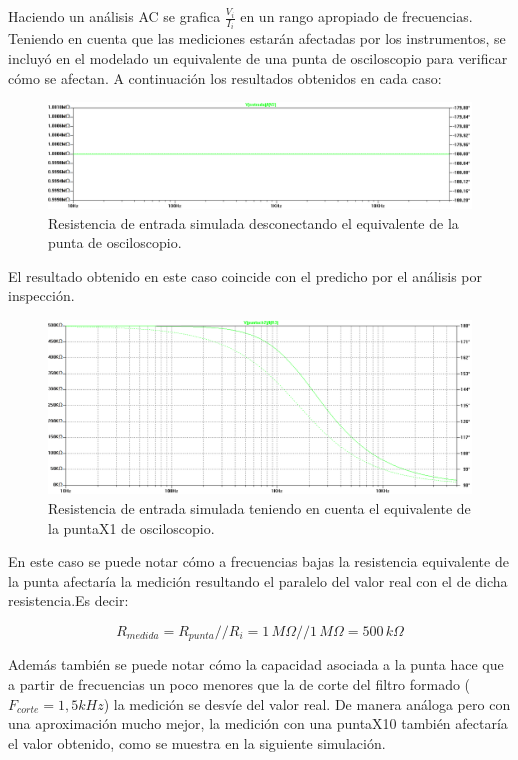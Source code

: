 \documentclass[10pt,spanish,a4paper,notitlepage]{article}
\begin{document}
Haciendo un análisis AC se grafica $\frac{V_i}{I_i}$ en un rango apropiado de frecuencias.
Teniendo en cuenta que las mediciones estarán afectadas por los instrumentos, se incluyó en el modelado un equivalente de una punta de osciloscopio para verificar cómo se afectan. A continuación los resultados obtenidos en cada caso:

\begin{figure}[H]
\centering
\includegraphics[scale=0.45]{senales/simulacion-Ri-sin-punta.png}
\caption{Resistencia de entrada simulada desconectando el equivalente de la punta de osciloscopio.}
\label{fig:SIMURi_sin_punta}
\end{figure}

El resultado obtenido en este caso coincide con el predicho por el análisis por inspección.

\begin{figure}[H]
\centering
\includegraphics[scale=0.45]{senales/simulacion-Ri-con-punta.png}
\caption{Resistencia de entrada simulada teniendo en cuenta el equivalente de la puntaX1 de osciloscopio.}
\label{fig:SIMURi_con_puntax1}
\end{figure}

En este caso se puede notar cómo a frecuencias bajas la resistencia equivalente de la punta afectaría la medición resultando el paralelo del valor real con el de dicha resistencia.Es decir:

\[ \displaystyle R_{medida}=R_{punta}//R_{i}=1\,\unit{M\Omega}//1\,\unit{M\Omega}=500\,\unit{k\Omega} \]

Además también se puede notar cómo la capacidad asociada a la punta hace que a partir de frecuencias un poco menores que la de corte del filtro formado  ($F_{corte}=1,5\unit{kHz}$) la medición se desvíe del valor real.
De manera análoga pero con una aproximación mucho mejor, la medición con una puntaX10 también afectaría el valor obtenido, como se muestra en la siguiente simulación.
\end{document}
